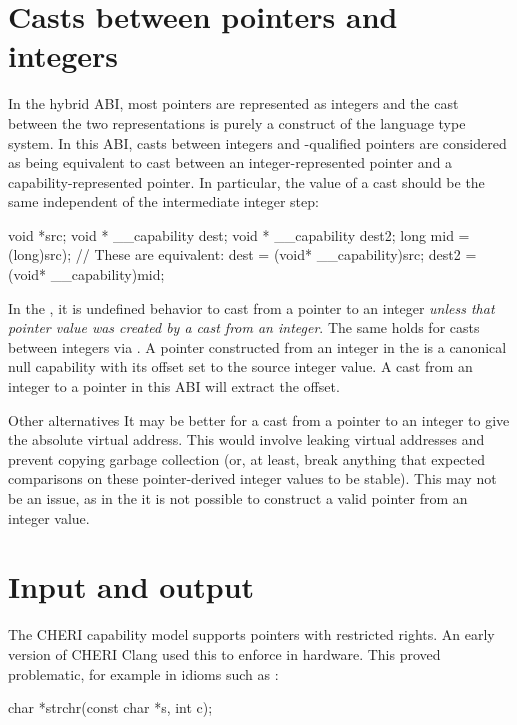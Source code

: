\section{Casts between pointers and integers}

In the hybrid ABI, most pointers are represented as integers and the cast between the two representations is purely a construct of the language type system.
In this ABI, casts between integers and -qualified pointers are considered as being equivalent to cast between an integer-represented pointer and a capability-represented pointer.
In particular, the value of a cast should be the same independent of the intermediate integer step:
\begin{csnippet}
	void *src;
	void * __capability dest;
	void * __capability dest2;
	long mid = (long)src);
	// These are equivalent:
	dest = (void* __capability)src;
	dest2 = (void* __capability)mid;
\end{csnippet}

In the \sandboxABI, it is undefined behavior to cast from a pointer to an integer \textit{unless that pointer value was created by a cast from an integer}.
The same holds for casts between integers via .
A pointer constructed from an integer in the \sandboxABI{} is a canonical null capability with its offset set to the source integer value.
A cast from an integer to a pointer in this ABI will extract the offset.

\begin{notebox}{Other alternatives}
	It may be better for a cast from a pointer to an integer to give the absolute virtual address.
	This would involve leaking virtual addresses and prevent copying garbage collection (or, at least, break anything that expected comparisons on these pointer-derived integer values to be stable).
	This may not be an issue, as in the \sandboxABI{} it is not possible to construct a valid pointer from an integer value.
\end{notebox}

\section{Input and output}

The CHERI capability model supports pointers with restricted rights.
An early version of CHERI Clang used this to enforce  in hardware.
This proved problematic, for example in idioms such as :

\begin{csnippet}
char *strchr(const char *s, int c);
\end{csnippet}


